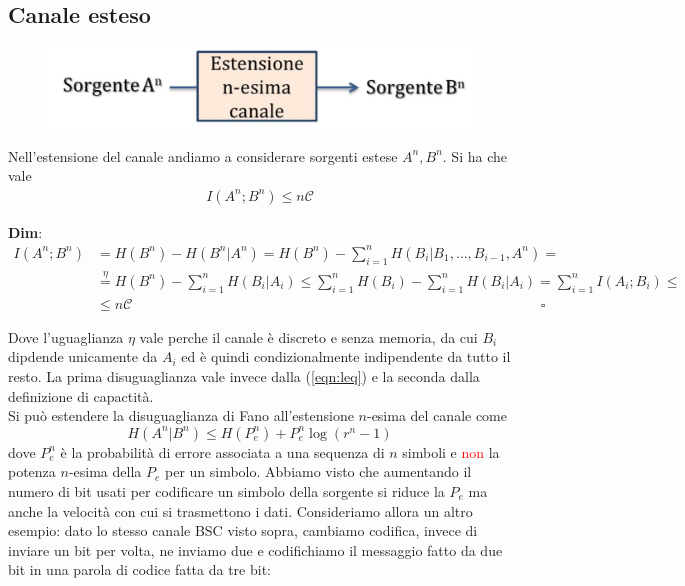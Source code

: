 \subsection{Canale esteso}
\begin{figure}[H]
    \centering
    \includegraphics[scale=0.2]{img/estchan.jpg}
\end{figure}
Nell'estensione del canale andiamo a considerare sorgenti estese $A^n, B^n$. Si ha che vale
\begin{align*}
    I(A^n;B^n) \leq n \mathcal{C}
\end{align*}
\begin{tcolorbox}
\textbf{Dim}:
\begin{align*}
    I(A^n;B^n) &= H(B^n) - H(B^n|A^n) = H(B^n) - \sum_{i=1}^n H(B_i|B_1, \dots, B_{i-1}, A^n) = \\
    &\overset{\eta}{=} H(B^n) - \sum_{i=1}^n H(B_i|A_i) \leq \sum_{i=1}^n H(B_i) - \sum_{i=1}^n H(B_i|A_i) = \sum_{i=1}^n I(A_i; B_i) \leq \\
    &\leq n \mathcal{C} \hspace{350pt} \square
\end{align*}
\end{tcolorbox}
Dove l'uguaglianza $\eta$ vale perche il canale \`e discreto e senza memoria, da cui $B_i$ dipdende unicamente da $A_i$ ed \`e quindi condizionalmente indipendente da tutto il resto. La prima disuguaglianza vale invece dalla (\ref{eqn:leq}) e la seconda dalla definizione di capactit\`a. \\
Si pu\`o estendere la disuguaglianza di Fano all'estensione $n$-esima del canale come
\begin{equation}
    H(A^n|B^n) \leq H(P_e^n) + P_e^n \log (r^n - 1)
\end{equation}
dove $P_e^n$ \`e la probabilit\`a di errore associata a una sequenza di $n$ simboli e \textcolor{red}{non} la potenza $n$-esima della $P_e$ per un simbolo.
Abbiamo visto che aumentando il numero di bit usati per codificare un simbolo della sorgente si riduce la $P_e$ ma anche la velocità con cui si trasmettono i dati. Consideriamo allora un altro esempio: dato lo stesso canale BSC visto sopra, cambiamo codifica, invece di inviare un bit per volta, ne inviamo due e codifichiamo il messaggio fatto da due bit in una parola di codice fatta da tre bit:
 
